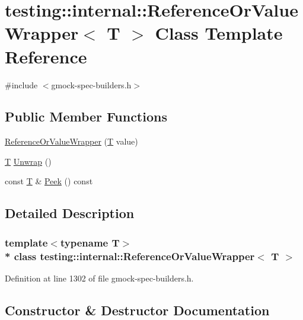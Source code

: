 \hypertarget{classtesting_1_1internal_1_1_reference_or_value_wrapper}{}\section{testing\+:\+:internal\+:\+:Reference\+Or\+Value\+Wrapper$<$ T $>$ Class Template Reference}
\label{classtesting_1_1internal_1_1_reference_or_value_wrapper}


{\ttfamily \#include $<$gmock-\/spec-\/builders.\+h$>$}

\subsection*{Public Member Functions}
\begin{DoxyCompactItemize}
\item 
\hyperlink{classtesting_1_1internal_1_1_reference_or_value_wrapper_ae5544acd43aa0feed92aa51b4186ede9}{Reference\+Or\+Value\+Wrapper} (\hyperlink{functions__7_8js_adf1f3edb9115acb0a1e04209b7a9937b}{T} value)
\item 
\hyperlink{functions__7_8js_adf1f3edb9115acb0a1e04209b7a9937b}{T} \hyperlink{classtesting_1_1internal_1_1_reference_or_value_wrapper_a5a6505b809ba770725e7b8091927a5ba}{Unwrap} ()
\item 
const \hyperlink{functions__7_8js_adf1f3edb9115acb0a1e04209b7a9937b}{T} \& \hyperlink{classtesting_1_1internal_1_1_reference_or_value_wrapper_a495d038e3d92ff12ac9d8d30ef9c590c}{Peek} () const 
\end{DoxyCompactItemize}


\subsection{Detailed Description}
\subsubsection*{template$<$typename T$>$\\*
class testing\+::internal\+::\+Reference\+Or\+Value\+Wrapper$<$ T $>$}



Definition at line 1302 of file gmock-\/spec-\/builders.\+h.



\subsection{Constructor \& Destructor Documentation}
